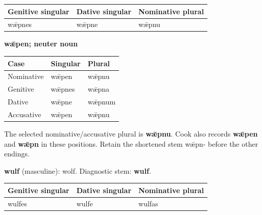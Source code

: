 \par\begingroup
\fontsize{10.5}{13.2}\selectfont
\setlength{\LTleft}{0pt}\setlength{\LTright}{\fill}
\noindent
\begin{tabular}{@{}>{\raggedright\arraybackslash}p{39.24mm}>{\raggedright\arraybackslash}p{36.31mm}>{\raggedright\arraybackslash}p{42.82mm}@{}}
\toprule
\textbf{Genitive singular} & \textbf{Dative singular} & \textbf{Nominative plural} \\
\midrule
wǣpnes & wǣpne & wǣpnu \\
\bottomrule
\end{tabular}
\par\endgroup

\textbf{wǣpen; neuter noun}

\par\begingroup
\fontsize{10.5}{13.2}\selectfont
\setlength{\LTleft}{0pt}\setlength{\LTright}{\fill}
\noindent
\begin{tabular}{@{}>{\raggedright\arraybackslash}p{39.46mm}>{\raggedright\arraybackslash}p{39.46mm}>{\raggedright\arraybackslash}p{39.46mm}@{}}
\toprule
\textbf{Case} & \textbf{Singular} & \textbf{Plural} \\
\midrule
Nominative & wǣpen & wǣpnu \\
Genitive & wǣpnes & wǣpna \\
Dative & wǣpne & wǣpnum \\
Accusative & wǣpen & wǣpnu \\
\bottomrule
\end{tabular}
\par\endgroup

The selected nominative/\allowbreak{}accusative plural is \textbf{wǣpnu}. Cook also records \textbf{wǣpen} and \textbf{wǣpn} in these positions. Retain the shortened stem wǣpn- before the other endings.

\textbf{wulf} (masculine): wolf. Diagnostic stem: \textbf{wulf}.

\par\begingroup
\fontsize{10.5}{13.2}\selectfont
\setlength{\LTleft}{0pt}\setlength{\LTright}{\fill}
\noindent
\begin{tabular}{@{}>{\raggedright\arraybackslash}p{39.24mm}>{\raggedright\arraybackslash}p{36.31mm}>{\raggedright\arraybackslash}p{42.82mm}@{}}
\toprule
\textbf{Genitive singular} & \textbf{Dative singular} & \textbf{Nominative plural} \\
\midrule
wulfes & wulfe & wulfas \\
\bottomrule
\end{tabular}
\par\endgroup

